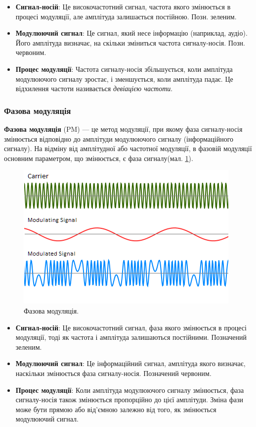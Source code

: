 \documentclass{article}
\begin{document}
\begin{itemize}[noitemsep, topsep=8pt]
\item \textbf{Сигнал-носій}: Це високочастотний сигнал, частота якого змінюється в процесі модуляції, але амплітуда залишається постійною. Позн. зеленим.
\item \textbf{Модулюючий сигнал}: Це сигнал, який несе інформацію (наприклад, аудіо). Його амплітуда визначає, на скільки зміниться частота сигналу-носія. Позн. червоним.
\item \textbf{Процес модуляції}: Частота сигналу-носія збільшується, коли амплітуда модулюючого сигналу зростає, і зменшується, коли амплітуда падає. Це відхилення частоти називається \textit{девіацією частоти}.
\end{itemize}

\subsubsection{Фазова модуляція}

\textbf{Фазова модуляція} (PM) --- це метод модуляції, при якому фаза сигналу-носія змінюється відповідно до амплітуди модулюючого сигналу (інформаційного сигналу). На відміну від амплітудної або частотної модуляції, в фазовій модуляції основним параметром, що змінюється, є фаза сигналу(мал. \ref{fig:pm}).

\begin{figure}[h!]
\centering
\includegraphics[width=0.6\linewidth]{images/pm.png}
\caption{\label{fig:pm}Фазова модуляція.}
\end{figure}

\begin{itemize}[noitemsep, topsep=8pt]
\item \textbf{Сигнал-носій}: Це високочастотний сигнал, фаза якого змінюється в процесі модуляції, тоді як частота і амплітуда залишаються постійними. Позначений зеленим.
\item \textbf{Модулюючий сигнал}: Це інформаційний сигнал, амплітуда якого визначає, наскільки змінюється фаза сигналу-носія. Позначений червоним.
\item \textbf{Процес модуляції}: Коли амплітуда модулюючого сигналу змінюється, фаза сигналу-носія також змінюється пропорційно до цієї амплітуди. Зміна фази може бути прямою або від'ємною залежно від того, як змінюється модулюючий сигнал.
\end{itemize}
\end{document}
